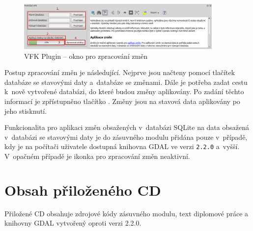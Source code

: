 \documentclass[a4paper,12pt,oneside]{book}
\begin{document}
\begin{figure}[htb]
\centering
\includegraphics[width=0.9\textwidth]{images/vfkPlugin-prirucka_zmeny.png}
\caption[VFK Plugin -- okno pro zpracování změn]{VFK Plugin -- okno pro zpracování změn}
\label{l_plugin_zmeny}
\end{figure}

Postup zpracování změn je následující. Nejprve jsou načteny pomocí
tlačítek  databáze se stavovými daty a~databáze se
změnami. Dále je potřeba zadat cestu k~nově vytvořené databázi, do
které budou změny aplikovány. Po zadání těchto informací je
zpřístupněno tlačítko . Změny jsou na stavová data
aplikovány po jeho stisknutí.

Funkcionalita pro aplikaci změn obsažených v~databázi SQLite na data
obsažená v~databázi se stavovými daty je do zásuvného modulu přidána
pouze v~případě, kdy je na počítači uživatele dostupná knihovna GDAL
ve verzi \texttt{2.2.0} a~vyšší. V~opačném případě je ikonka pro
zpracování změn neaktivní.

\chapter{Obsah přiloženého CD}

Přiložené CD obsahuje zdrojové kódy zásuvného modulu, text diplomové práce a  knihovny GDAL vytvořený oproti
verzi 2.2.0.

\begin{minipage}{0.9\textwidth}
\end{minipage}
\end{document}
